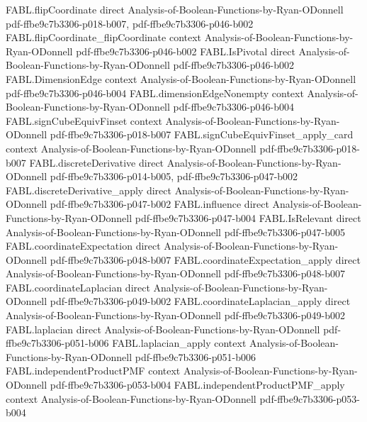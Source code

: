\begin{theorem}
\proofstep
  {FABL.flipCoordinate}
  {direct}
  {Analysis-of-Boolean-Functions-by-Ryan-ODonnell}
  {pdf-ffbe9c7b3306-p018-b007,
    pdf-ffbe9c7b3306-p046-b002}
\proofstep
  {FABL.flipCoordinate_flipCoordinate}
  {context}
  {Analysis-of-Boolean-Functions-by-Ryan-ODonnell}
  {pdf-ffbe9c7b3306-p046-b002}
\proofstep
  {FABL.IsPivotal}
  {direct}
  {Analysis-of-Boolean-Functions-by-Ryan-ODonnell}
  {pdf-ffbe9c7b3306-p046-b002}
\proofstep
  {FABL.DimensionEdge}
  {context}
  {Analysis-of-Boolean-Functions-by-Ryan-ODonnell}
  {pdf-ffbe9c7b3306-p046-b004}
\proofstep
  {FABL.dimensionEdgeNonempty}
  {context}
  {Analysis-of-Boolean-Functions-by-Ryan-ODonnell}
  {pdf-ffbe9c7b3306-p046-b004}
\proofstep
  {FABL.signCubeEquivFinset}
  {context}
  {Analysis-of-Boolean-Functions-by-Ryan-ODonnell}
  {pdf-ffbe9c7b3306-p018-b007}
\proofstep
  {FABL.signCubeEquivFinset_apply_card}
  {context}
  {Analysis-of-Boolean-Functions-by-Ryan-ODonnell}
  {pdf-ffbe9c7b3306-p018-b007}
\proofstep
  {FABL.discreteDerivative}
  {direct}
  {Analysis-of-Boolean-Functions-by-Ryan-ODonnell}
  {pdf-ffbe9c7b3306-p014-b005,
    pdf-ffbe9c7b3306-p047-b002}
\proofstep
  {FABL.discreteDerivative_apply}
  {direct}
  {Analysis-of-Boolean-Functions-by-Ryan-ODonnell}
  {pdf-ffbe9c7b3306-p047-b002}
\proofstep
  {FABL.influence}
  {direct}
  {Analysis-of-Boolean-Functions-by-Ryan-ODonnell}
  {pdf-ffbe9c7b3306-p047-b004}
\proofstep
  {FABL.IsRelevant}
  {direct}
  {Analysis-of-Boolean-Functions-by-Ryan-ODonnell}
  {pdf-ffbe9c7b3306-p047-b005}
\proofstep
  {FABL.coordinateExpectation}
  {direct}
  {Analysis-of-Boolean-Functions-by-Ryan-ODonnell}
  {pdf-ffbe9c7b3306-p048-b007}
\proofstep
  {FABL.coordinateExpectation_apply}
  {direct}
  {Analysis-of-Boolean-Functions-by-Ryan-ODonnell}
  {pdf-ffbe9c7b3306-p048-b007}
\proofstep
  {FABL.coordinateLaplacian}
  {direct}
  {Analysis-of-Boolean-Functions-by-Ryan-ODonnell}
  {pdf-ffbe9c7b3306-p049-b002}
\proofstep
  {FABL.coordinateLaplacian_apply}
  {direct}
  {Analysis-of-Boolean-Functions-by-Ryan-ODonnell}
  {pdf-ffbe9c7b3306-p049-b002}
\proofstep
  {FABL.laplacian}
  {direct}
  {Analysis-of-Boolean-Functions-by-Ryan-ODonnell}
  {pdf-ffbe9c7b3306-p051-b006}
\proofstep
  {FABL.laplacian_apply}
  {context}
  {Analysis-of-Boolean-Functions-by-Ryan-ODonnell}
  {pdf-ffbe9c7b3306-p051-b006}
\proofstep
  {FABL.independentProductPMF}
  {context}
  {Analysis-of-Boolean-Functions-by-Ryan-ODonnell}
  {pdf-ffbe9c7b3306-p053-b004}
\proofstep
  {FABL.independentProductPMF_apply}
  {context}
  {Analysis-of-Boolean-Functions-by-Ryan-ODonnell}
  {pdf-ffbe9c7b3306-p053-b004}
\proofstep

\end{theorem}
